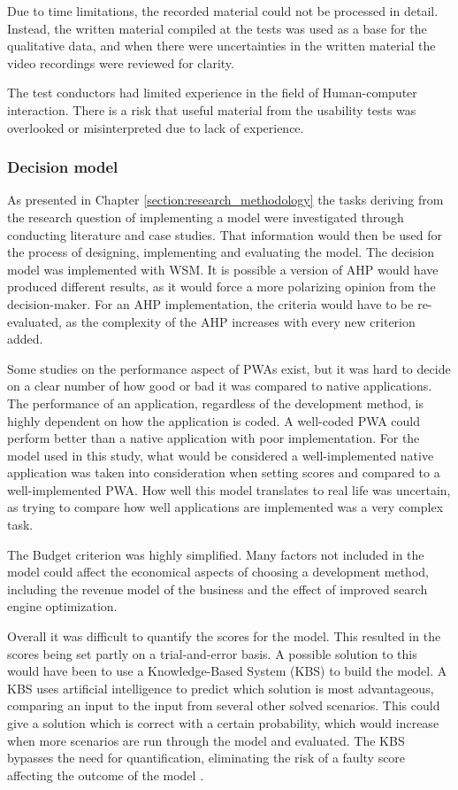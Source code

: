 Due to time limitations, the recorded material could not be processed in detail. Instead, the written material compiled at the tests was used as a base for the qualitative data, and when there were uncertainties in the written material the video recordings were reviewed for clarity.

The test conductors had limited experience in the field of Human-computer interaction. There is a risk that useful material from the usability tests was overlooked or misinterpreted due to lack of experience. 

\subsubsection{Decision model}

As presented in Chapter \ref{section:research_methodology} the tasks deriving from the research question of implementing a model were investigated through conducting literature and case studies. That information would then be used for the process of designing, implementing and evaluating the model.
The decision model was implemented with WSM. It is possible a version of AHP would have produced different results, as it would force a more polarizing opinion from the decision-maker. For an AHP implementation, the criteria would have to be re-evaluated, as the complexity of the AHP increases with every new criterion added. 

Some studies on the performance aspect of PWAs exist, but it was hard to decide on a clear number of how good or bad it was compared to native applications. The performance of an application, regardless of the development method, is highly dependent on how the application is coded. A well-coded PWA could perform better than a native application with poor implementation. For the model used in this study, what would be considered a well-implemented native application was taken into consideration when setting scores and compared to a well-implemented PWA. How well this model translates to real life was uncertain, as trying to compare how well applications are implemented was a very complex task.

The Budget criterion was highly simplified. Many factors not included in the model could affect the economical aspects of choosing a development method, including the revenue model of the business and the effect of improved search engine optimization.

Overall it was difficult to quantify the scores for the model. This resulted in the scores being set partly on a trial-and-error basis. A possible solution to this would have been to use a Knowledge-Based System (KBS) to build the model. A KBS uses artificial intelligence to predict which solution is most advantageous, comparing an input to the input from several other solved scenarios. This could give a solution which is correct with a certain probability, which would increase when more scenarios are run through the model and evaluated. The KBS bypasses the need for quantification, eliminating the risk of a faulty score affecting the outcome of the model \cite{Brent1986}.

